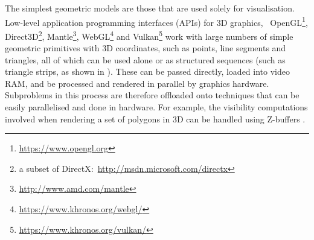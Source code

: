 The simplest geometric models are those that are used solely for visualisation.
Low-level application programming interfaces (APIs) for 3D graphics, \eg\ OpenGL\footnote{\url{https://www.opengl.org}}, Direct3D\footnote{a subset of DirectX:\ \url{http://msdn.microsoft.com/directx}}, Mantle\footnote{\url{http://www.amd.com/mantle}}, WebGL\footnote{\url{https://www.khronos.org/webgl/}} and Vulkan\footnote{\url{https://www.khronos.org/vulkan/}} work with large numbers of simple geometric primitives with 3D coordinates, such as points, line segments and triangles, all of which can be used alone or as structured sequences (such as triangle strips, as shown in ).
These can be passed directly, loaded into video RAM, and be processed and rendered in parallel by graphics hardware.
Subproblems in this process are therefore offloaded onto techniques that can be easily parallelised and done in hardware.
For example, the visibility computations involved when rendering a set of polygons in 3D can be handled using Z-buffers \citep{Strasser74}.

